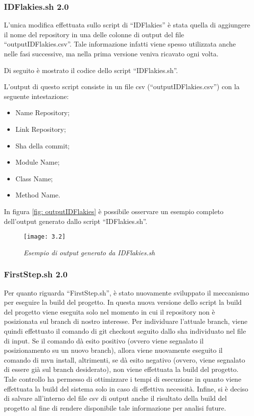\subsubsection{IDFlakies.sh 2.0}
L’unica modifica effettuata sullo script di “IDFlakies” è stata quella di aggiungere il nome del repository in una delle colonne di output del file “outputIDFlakies.csv”. Tale informazione infatti viene spesso utilizzata anche nelle fasi successive, ma nella prima versione veniva ricavato ogni volta.

Di seguito è mostrato il codice dello script “IDFlakies.sh”.


L’output di questo script consiste in un file csv (“outputIDFlakies.csv”) con la seguente intestazione:
\begin{itemize}
	\item Name Repository;
	\item Link Repository;
	\item Sha della commit;
	\item Module Name;
	\item Class Name;
	\item Method Name.
\end{itemize}

In figura \ref{fig: outputIDFlakies} è possibile osservare un esempio completo dell’output generato dallo script “IDFlakies.sh”.
\newpage
\begin{figure}[h]
	\centering
	\texttt{[image: 3.2]}
	\caption{\emph{Esempio di output generato da IDFlakies.sh}}
	\label{fig:outputIDFlakies}
\end{figure}
\subsubsection{FirstStep.sh 2.0}
Per quanto riguarda “FirstStep.sh”, è stato nuovamente sviluppato il
meccanismo per eseguire la build del progetto. In questa nuova versione dello script la build del progetto viene eseguita solo nel momento in cui il repository non è posizionata sul branch di nostro interesse. Per individuare l’attuale branch, viene quindi effettuato il comando di git checkout seguito dallo sha individuato nel file di
input. Se il comando dà esito positivo (ovvero viene segnalato il posizionamento su un nuovo branch), allora viene nuovamente eseguito il comando di mvn install, altrimenti, se dà esito negativo (ovvero, viene segnalato di essere già sul branch desiderato), non viene effettuata la build del progetto. Tale controllo ha permesso
di ottimizzare i tempi di esecuzione in quanto viene effettuata la build del sistema solo in caso di effettiva necessità. Infine, si è deciso di salvare all’interno del file csv di output anche il risultato della build del progetto al fine di rendere disponibile
tale informazione per analisi future.

